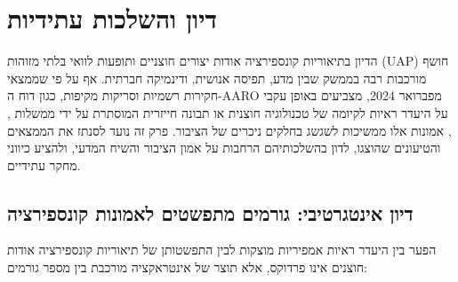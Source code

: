 \documentclass[12pt,a4paper]{article}
\begin{document}
\section{דיון והשלכות עתידיות}

הדיון בתיאוריות קונספירציה אודות יצורים חוצניים ותופעות לוואי בלתי מזוהות (UAP) חושף מורכבות רבה בממשק שבין מדע, תפיסה אנושית, ודינמיקה חברתית. אף על פי שממצאי חקירות רשמיות וסריקות מקיפות, כגון דוח ה-AARO מפברואר 2024, מצביעים באופן עקבי על היעדר ראיות לקיומה של טכנולוגיה חוצנית או תבונה חייזרית המוסתרת על ידי ממשלות \cite{aaro2024misidentification}, \cite{aaro2024noevidence}, אמונות אלו ממשיכות לשגשג בחלקים ניכרים של הציבור. פרק זה נועד לסנתז את הממצאים והטיעונים שהוצגו, לדון בהשלכותיהם הרחבות על אמון הציבור והשיח המדעי, ולהציע כיווני מחקר עתידיים.

\subsection{דיון אינטגרטיבי: גורמים מתפשטים לאמונות קונספירציה}

הפער בין היעדר ראיות אמפיריות מוצקות לבין התפשטותן של תיאוריות קונספירציה אודות חוצנים אינו פרדוקס, אלא תוצר של אינטראקציה מורכבת בין מספר גורמים:
\end{document}
